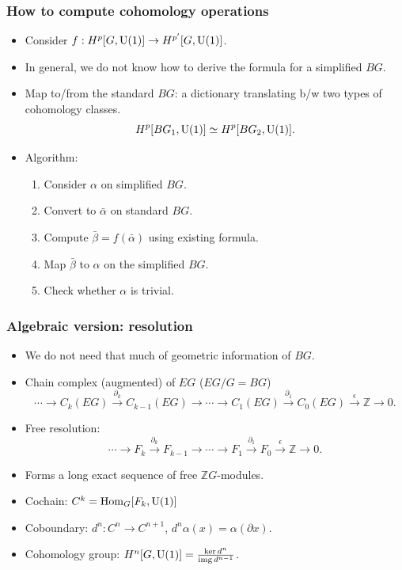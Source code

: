 \documentclass[xcolor=table, aspectratio=43,ignorenonframetext]{beamer}
\DeclareMathOperator{\img}{img}
\DeclareMathOperator{\hhom}{Hom}
\newcommand{\uone}{\text U(1)}
\begin{document}
\begin{frame}
	\frametitle{How to compute cohomology operations}
	\begin{itemize}
		\item Consider $f: H^p[G,\uone]\rightarrow H^{p'}[G, \uone]$.
		\item In general, we do not know how to derive the formula for a simplified $BG$.
		\item Map to/from the standard $BG$: a dictionary translating b/w two types of cohomology classes.
		\[H^p[BG_1,\uone]\simeq H^p[BG_2,\uone].\]
		\item Algorithm:
		\begin{enumerate}
			\item Consider $\alpha$ on simplified $BG$.
			\item Convert to $\bar\alpha$ on standard $BG$.
			\item Compute $\bar\beta = f(\bar\alpha)$ using existing formula.
			\item Map $\bar\beta$ to $\alpha$ on the simplified $BG$.
			\item Check whether $\alpha$ is trivial.
		\end{enumerate}
	\end{itemize}
\end{frame}

\begin{frame}
	\frametitle{Algebraic version: resolution}
	\begin{itemize}
		\item We do not need that much of geometric information of $BG$.
		\item Chain complex (augmented) of $EG$ ($EG/G=BG$)
		\[\cdots\rightarrow C_k(EG)\xrightarrow{\partial_k}
		C_{k-1}(EG)\rightarrow\cdots\rightarrow
		C_1(EG)\xrightarrow{\partial_1}
		C_0(EG)\xrightarrow{\epsilon}\mathbb Z\rightarrow0.\]
		\item Free resolution:
		\[\cdots\rightarrow F_k\xrightarrow{\partial_k}
		F_{k-1}\rightarrow\cdots\rightarrow
		F_1\xrightarrow{\partial_1}
		F_0\xrightarrow{\epsilon}\mathbb Z\rightarrow0.\]
		\item Forms a long exact sequence of free $\mathbb ZG$-modules.
		\item Cochain: $C^k=\hhom_G[F_k, \uone]$
		\item Coboundary: $d^n:C^n\rightarrow C^{n+1}$, $d^n\alpha(x) = \alpha(\partial x)$.
		\item Cohomology group: $H^n[G, \uone]=\frac{\ker d^n}{\img d^{n-1}}$.
	\end{itemize}
\end{frame}
\end{document}
